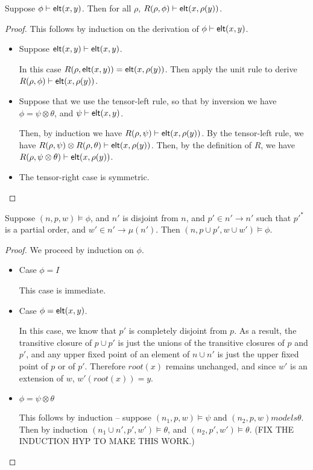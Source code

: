\begin{lemma}
  Suppose ${\phi} \vdash \mathsf{elt}({x}, {y})$. Then for all $\rho$, ${R(\rho, \phi)} \vdash \mathsf{elt}({x}, {\rho(y)})$. 
\end{lemma}

\begin{proof}
This follows by induction on the derivation of ${\phi} \vdash \mathsf{elt}({x}, {y})$. 
\begin{itemize}
\item Suppose ${\mathsf{elt}({x}, {y})} \vdash \mathsf{elt}({x}, {y})$. 

In this case $R(\rho, \mathsf{elt}({x}, {y})) = \mathsf{elt}({x}, {\rho(y)})$. Then apply the 
unit rule to derive ${R(\rho, \phi)} \vdash \mathsf{elt}({x}, {\rho(y)})$. 

\item Suppose that we use the tensor-left rule, so that by inversion we have
$\phi = \psi \otimes \theta$, and ${\psi} \vdash \mathsf{elt}({x}, {y})$. 

Then, by induction we have ${R(\rho, \psi)} \vdash \mathsf{elt}({x}, {\rho(y)})$. 
By the tensor-left rule, we have ${R(\rho, \psi) \otimes R(\rho, \theta)} \vdash \mathsf{elt}({x}, {\rho(y)})$. Then, by the definition of $R$, we have ${R(\rho, \psi \otimes \theta)} \vdash \mathsf{elt}({x}, {\rho(y)})$.

\item The tensor-right case is symmetric. 
\end{itemize}
\end{proof}

\begin{lemma}
  Suppose $(n, p, w) \models \phi$, and $n'$ is disjoint from $n$, and $p' \in n' \to n'$ such that $p'^*$ is a partial order, and $w' \in n' \to \mu(n')$. Then $(n, p \cup p', w \cup w') \models \phi$. 
\end{lemma}

\begin{proof}
 We proceed by induction on $\phi$. 

 \begin{itemize}
   \item Case $\phi = I$

     This case is immediate. 

   \item Case $\phi = \mathsf{elt}({x}, {y})$. 

     In this case, we know that $p'$ is completely disjoint from $p$. As a result, the transitive closure of $p \cup p'$ is just the unions of the transitive closures of $p$ and $p'$, and any upper fixed point of an element of $n \cup n'$ is just the upper fixed point of $p$ or of $p'$. Therefore $\mathit{root}(x)$ remains unchanged, and since $w'$ is an extension of $w$, $w'(\mathit{root}(x)) = y$. 
     
     \item $\phi = \psi \otimes \theta$

       This follows by induction -- suppose $(n_1, p, w) \models \psi$ and 
       $(n_2, p, w) models \theta$. Then by induction $(n_1 \cup n', p', w') \models \theta$, and $(n_2, p', w') \models \theta$. (FIX THE INDUCTION HYP TO MAKE THIS WORK.)
       
 \end{itemize}
\end{proof}

